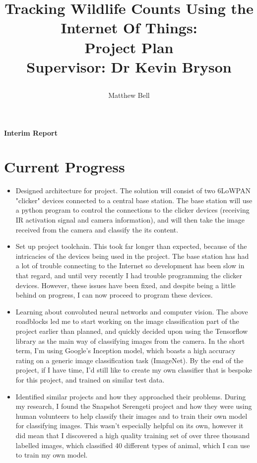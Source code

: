 \documentclass{article}
\title{\protect\parbox{\textwidth}{\protect\centering %
Tracking Wildlife Counts Using the Internet Of Things: \\
Project Plan \\ \vspace{1em}
\large Supervisor: Dr Kevin Bryson}} \author{Matthew Bell}
\begin{document}
 \maketitle

\begin{center}
    \huge \bfseries \headingfont Interim Report
\end{center}

\section*{Current Progress}
\begin{itemize}
    \item Designed architecture for project. The solution will consist of two
    6LoWPAN "clicker" devices connected to a central base station. The base
    station will use a python program to control the connections to the
    clicker devices (receiving IR activation signal and camera information),
    and will then take the image received from the camera and classify the
    its content.
    \item Set up project toolchain. This took far longer than expected,
    because of the intricacies of the devices being used in the project. The
    base station has had a lot of trouble connecting to the Internet so
    development has been slow in that regard, and until very recently I had
    trouble programming the clicker devices. However, these issues have been
    fixed, and despite being a little behind on progress, I can now proceed
    to program these devices.
    \item Learning about convoluted neural networks and computer vision. The
    above roadblocks led me to start working on the image classification part
    of the project earlier than planned, and quickly decided upon using the
    Tensorflow library as the main way of classifying images from the camera.
    In the short term, I'm using Google's Inception model, which boasts a
    high accuracy rating on a generic image classification task (ImageNet).
    By the end of the project, if I have time, I'd still like to create my
    own classifier that is bespoke for this project, and trained on similar
    test data.
    \item Identified similar projects and how they approached their problems.
    During my research, I found the Snapshot Serengeti project and how they
    were using human volunteers to help classify their images and to train
    their own model for classifying images. This wasn't especially helpful on
    its own, however it did mean that I discovered a high quality training
    set of over three thousand labelled images, which classified 40 different
    types of animal, which I can use to train my own model.
\end{itemize}
\end{document}
